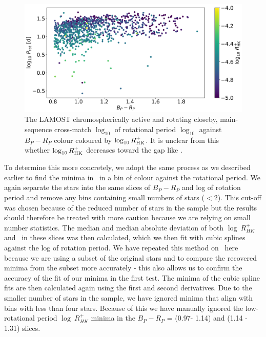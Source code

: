 \begin{figure}
\centering
    \includegraphics[width=\textwidth]{Figures/rot_gap_figures/rotational_dist_rhk.png}
    \caption{
    The LAMOST chromospherically active and \kepler{} rotating closeby, main-sequence cross-match $\log_{10}$ of rotational period $\log_10$ against \gaia $B_P-R_P$ colour coloured by $\log_{10}R^{+}_{\rm{HK}}$. It is unclear from this whether $\log_{10}R^{+}_{\rm{HK}}$ decreases toward the gap like \rper{}.}
    \label{fig:rot_dist_rhk}
\end{figure}

To determine this more concretely, we adopt the same process as we described earlier to find the minima in \rper{} \ in a bin of colour against the rotational period.
We again separate the stars into the same slices of $B_P-R_P$ and log of rotation period and remove any bins containing small numbers of stars ($<$2).
This cut-off was chosen because of the reduced number of stars in the sample but the results should therefore be treated with more caution because we are relying on small number statistics.
The median and median absolute deviation of both $\log \ R^{+}_{HK}$ and \rper{} \ in these slices was then calculated, which we then fit with cubic splines against the log of rotation period.
We have repeated this method on \rper{} \ here because we are using a subset of the original stars and to compare the recovered minima from the subset more accurately - this also allows us to confirm the accuracy of the fit of our minima in the first test.
The minima of the cubic spline fits are then calculated again using the first and second derivatives.
Due to the smaller number of stars in the sample, we have ignored minima that align with bins with less than four stars. 
Because of this we have manually ignored the low-rotational period $\log \ R^{+}_{HK}$ minima in the $B_P - R_P$ = (0.97- 1.14) and (1.14 - 1.31) slices.

